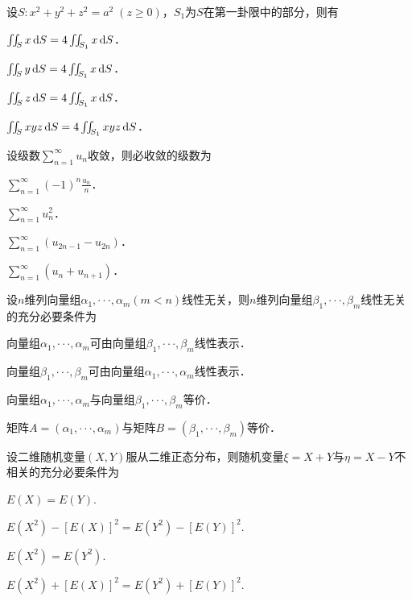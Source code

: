 \documentclass[plain,noanswer,medmath]{../../template/jnuexam}
\begin{document}
\begin{problem}
设$S: x^2 + y^2 + z^2 = a^2\;(z \ge 0)$，$S_1$为$S$在第一卦限中的部分，则有\pickout{}
\begin{abcd}
\item $\iint_S x\mathop{}\!\mathrm{d} S = 4\iint_{S_1} x\mathop{}\!\mathrm{d} S$．
\item $\iint_S y\mathop{}\!\mathrm{d} S = 4\iint_{S_1} x\mathop{}\!\mathrm{d} S$．
\item $\iint_S z\mathop{}\!\mathrm{d} S = 4\iint_{S_1} x\mathop{}\!\mathrm{d} S$．
\item $\iint_S xyz\mathop{}\!\mathrm{d} S = 4\iint_{S_1} xyz\mathop{}\!\mathrm{d} S$．
\end{abcd}
\end{problem}


\begin{problem}
设级数$\sum_{n = 1}^{\infty}u_n$收敛，则必收敛的级数为\pickout{}
\begin{abcd}
\item $\sum_{n = 1}^{\infty}(- 1)^n\frac{u_n}{n}$．
\item $\sum_{n = 1}^{\infty}u_n^2$．
\item $\sum_{n = 1}^{\infty}(u_{2n - 1} - u_{2n})$．
\item $\sum_{n = 1}^{\infty}(u_n + u_{n + 1})$．
\end{abcd}
\end{problem}


\begin{problem}
设$n$维列向量组$\alpha_1, \cdot \cdot \cdot ,\alpha_m(m < n)$线性无关，则$n$维列向量组$\beta_1, \cdot \cdot \cdot ,\beta_m$线性无关的充分必要条件为\pickout{}
\begin{abcd}
\item 向量组$\alpha_1, \cdot \cdot \cdot ,\alpha_m$可由向量组$\beta_1, \cdot \cdot \cdot ,\beta_m$线性表示．
\item 向量组$\beta_1, \cdot \cdot \cdot ,\beta_m$可由向量组$\alpha_1, \cdot \cdot \cdot ,\alpha_m$线性表示．
\item 向量组$\alpha_1, \cdot \cdot \cdot ,\alpha_m$与向量组$\beta_1, \cdot \cdot \cdot ,\beta_m$等价．
\item 矩阵$A = \left(\alpha_1, \cdot \cdot \cdot ,\alpha_m \right)$与矩阵$B = \left(\beta_1, \cdot \cdot \cdot ,\beta_m \right)$等价．
\end{abcd}
\end{problem}


\begin{problem}
设二维随机变量$\left(X,Y \right)$服从二维正态分布，则随机变量$\xi = X + Y$与$\eta = X - Y$不相关的充分必要条件为\pickout{}
\begin{abcd}
\item $E(X) = E(Y).$
\item $E(X^2) - \left[E(X) \right]^2 = E(Y^2) - \left[E(Y) \right]^2.$
\item $E(X^2) = E(Y^2).$
\item $E(X^2) + \left[E(X) \right]^2 = E(Y^2) + \left[E(Y) \right]^2.$
\end{abcd}
\end{problem}
\end{document}
